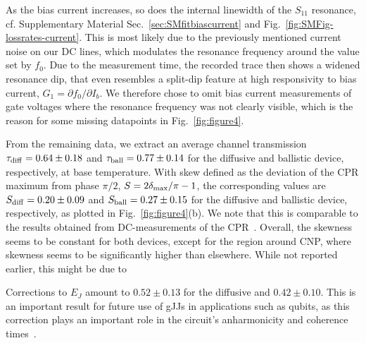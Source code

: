 As the bias current increases, so does the internal linewidth of the $S_{11}$ resonance, cf. Supplementary Material Sec.~\ref{sec:SMfitbiascurrent} and Fig.~\ref{fig:SMFig-lossrates-current}.
%
This is most likely due to the previously mentioned current noise on our DC lines, which modulates the resonance frequency around the value set by $f_0$.
%
Due to the measurement time, the recorded trace then shows a widened resonance dip, that even resembles a split-dip feature at high responsivity to bias current, $G_1=\partial f_0/\partial I_b$.
%
We therefore chose to omit bias current measurements of gate voltages where the resonance frequency was not clearly visible, which is the reason for some missing datapoints in Fig.~\ref{fig:figure4}.

From the remaining data, we extract an average channel transmission $\tau_{\rm diff}=0.64\pm0.18$ and $\tau_{\rm ball}=0.77\pm0.14$ for the diffusive and ballistic device, respectively, at base temperature.
%
With skew defined as the deviation of the CPR maximum from phase $\pi/2$, $S=2\delta_{\rm max}/\pi -1$, the corresponding values are $S_{\rm diff}=0.20\pm0.09$ and $S_{\rm ball}=0.27\pm0.15$ for the diffusive and ballistic device, respectively, as plotted in Fig.~\ref{fig:figure4}(b).
%
We note that this is comparable to the results obtained from DC-measurements of the CPR~\cite{englishObservationNonsinusoidalCurrentphase2016,nandaCurrentPhaseRelationBallistic2017}.
%
Overall, the skewness seems to be constant for both devices, except for the region around CNP, where skewness seems to be significantly higher than elsewhere.
%
While not reported earlier, this might be due to 




Corrections to $E_J$ amount to $0.52\pm0.13$ for the diffusive and $0.42\pm0.10$.
%
This is an important result for future use of gJJs in applications such as qubits, as this correction plays an important role in the circuit's anharmonicity and coherence times~\cite{kringhojAnharmonicitySuperconductingQubit2018}.

